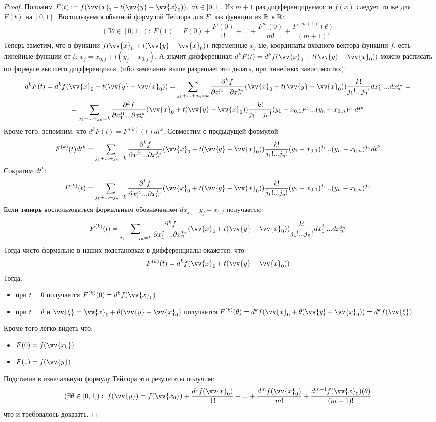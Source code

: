 \begin{proof}
	Положим $F(t) := f(\vv{x}_0 + t(\vv{y} - \vv{x}_0)),\  \forall t \in [0, 1]$. Из $m+1$ раз дифференцируемости $f(x)$ следует то же для $F(t)$ на $[0,1]$. Воспользуемся обычной формулой Тейлора для $F$, как функции из $\mathbb{R}$ в $\mathbb{R}$:
	\[
		(\exists \theta \in [0,1]):\  F(1)=F(0)+\frac{F'(0)}{1!}+...+\frac{F^{m}(0)}{m!}+\frac{F^{(m+1)}(\theta)}{(m+1)!}
	\]
	Теперь заметим, что в функции $f(\vv{x}_0 + t(\vv{y} - \vv{x}_0))$ переменные $x_j$-ые, координаты входного вектора функции $f$, есть линейные функции от $t$: $x_j = x_{0,j} + t(y_j-x_{0,j})$. А значит дифференциал $d^kF(t)=d^kf(\vv{x}_0 + t(\vv{y} - \vv{x}_0))$ можно расписать по формуле высшего дифференциала, (ибо замечание выше разрешает это делать, при линейных зависимостях):
	\begin{multline*}
		d^kF(t)=d^kf(\vv{x}_0 + t(\vv{y} - \vv{x}_0)) = \suml_{j_1 +...+j_n = k}\frac{\vdelta^k f}{\vdelta x_1^{j_1}...\vdelta x_n^{j_n}}(\vv{x}_0 + t(\vv{y} - \vv{x}_0))\frac{k!}{j_1!...j_n!}dx_1^{j_1}...dx_n^{j_n}=
		\\
		=
		\suml_{j_1 +...+j_n = k}\frac{\vdelta^k f}{\vdelta x_1^{j_1}...\vdelta x_n^{j_n}}(\vv{x}_0 + t(\vv{y} - \vv{x}_0))\frac{k!}{j_1!...j_n!}(y_1-x_{0,1})^{j_1}...(y_n-x_{0,n})^{j_n}dt^k
	\end{multline*}
	Кроме того, вспомним, что $d^kF(t) = F^{(k)}(t)dt^k$.
	Совместим с предыдущей формулой:
	\[
		F^{(k)}(t)dt^k = \suml_{j_1 +...+j_n = k}\frac{\vdelta^k f}{\vdelta x_1^{j_1}...\vdelta x_n^{j_n}}(\vv{x}_0 + t(\vv{y} - \vv{x}_0))\frac{k!}{j_1!...j_n!}(y_1-x_{0,1})^{j_1}...(y_n-x_{0,n})^{j_n}dt^k
	\]
	Сократим $dt^k$:
	\[
		F^{(k)}(t) = \suml_{j_1 +...+j_n = k}\frac{\vdelta^k f}{\vdelta x_1^{j_1}...\vdelta x_n^{j_n}}(\vv{x}_0 + t(\vv{y} - \vv{x}_0))\frac{k!}{j_1!...j_n!}(y_1-x_{0,1})^{j_1}...(y_n-x_{0,n})^{j_n}
	\]
	Если \textbf{теперь} воспользоваться формальным обозначением $ dx_j = y_j - x_{0, j}$ получается:
	\[
	F^{(k)}(t) = \suml_{j_1 +...+j_n = k}\frac{\vdelta^k f}{\vdelta x_1^{j_1}...\vdelta x_n^{j_n}}(\vv{x}_0 + t(\vv{y} - \vv{x}_0))\frac{k!}{j_1!...j_n!}dx_1^{j_1}...dx_n^{j_n}
	\]
	Тогда  чисто формально в наших подстановках в дифференциалы окажется, что
	\[
		F^{(k)}(t) = d^kf(\vv{x}_0 + t(\vv{y} - \vv{x}_0))
	\]
	Тогда:
	\begin{itemize}
		\item при $t=0$ получается  $F^{(k)}(0) = d^kf(\vv{x}_0)$
		\item при $t = \theta$ и $\vv{\xi} =\vv{x}_0 + \theta(\vv{y} - \vv{x}_0)$ получается
		$F^{(k)}(\theta) = d^kf(\vv{x}_0 + \theta(\vv{y} - \vv{x}_0)) = d^kf(\vv{\xi})$ 
	\end{itemize}
	Кроме того легко видеть что:
	\begin{itemize}
		\item $F(0) = f(\vv{x_0})$
		\item $F(1) = f(\vv{y})$ 
	\end{itemize}
	Подставив в  изначальную формулу Тейлора эти результаты получим:
	\[
	(\exists \theta \in [0,1]):\  f(\vv{y})=f(\vv{x_0})+\frac{d^1f(\vv{x}_0)}{1!}+...+\frac{d^mf(\vv{x}_0)}{m!}+\frac{d^{m+1}f(\vv{x}_0)(\theta)}{(m+1)!}
	\]
	что и требовалось доказать.
	
\end{proof}

